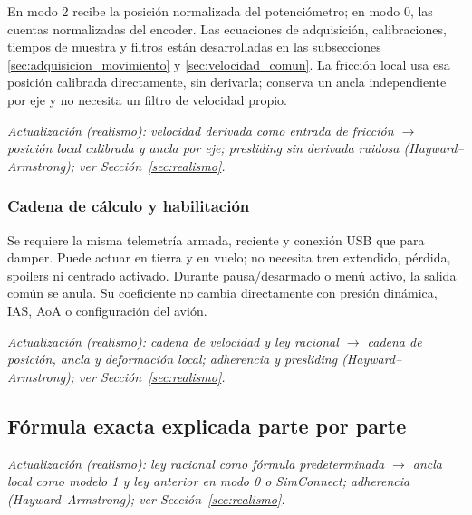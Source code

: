 \documentclass[11pt,a4paper]{article}
\begin{document}
En modo 2 recibe la posición normalizada del potenciómetro; en modo 0, las cuentas normalizadas del encoder. Las ecuaciones de adquisición, calibraciones, tiempos de muestra y filtros están desarrolladas en las subsecciones \ref{sec:adquisicion_movimiento} y \ref{sec:velocidad_comun}. La fricción local usa esa posición calibrada directamente, sin derivarla; conserva un ancla independiente por eje y no necesita un filtro de velocidad propio.

\textit{Actualización (realismo): velocidad derivada como entrada de fricción $\rightarrow$ posición local calibrada y ancla por eje; presliding sin derivada ruidosa (Hayward--Armstrong); ver Sección~\ref{sec:realismo}.}

\subsubsection{Cadena de cálculo y habilitación}
\begin{center}
\end{center}
Se requiere la misma telemetría armada, reciente y conexión USB que para damper. Puede actuar en tierra y en vuelo; no necesita tren extendido, pérdida, spoilers ni centrado activado. Durante pausa/desarmado o menú activo, la salida común se anula. Su coeficiente no cambia directamente con presión dinámica, IAS, AoA o configuración del avión.

\textit{Actualización (realismo): cadena de velocidad y ley racional $\rightarrow$ cadena de posición, ancla y deformación local; adherencia y presliding (Hayward--Armstrong); ver Sección~\ref{sec:realismo}.}

\subsection{Fórmula exacta explicada parte por parte}

\textit{Actualización (realismo): ley racional como fórmula predeterminada $\rightarrow$ ancla local como modelo 1 y ley anterior en modo 0 o SimConnect; adherencia (Hayward--Armstrong); ver Sección~\ref{sec:realismo}.}
\end{document}
